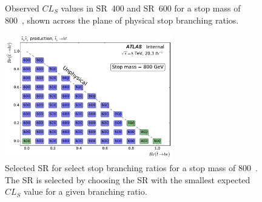 \begin{figure}[ht]
  \centering
  \caption{
    Observed $CL_S$ values in SR~400 and SR~600 for a stop mass of 800~\GeV,
    shown across the plane of physical stop branching ratios.
  }
\end{figure}

\begin{figure}[ht]
  \centering
  \includegraphics[width=0.65\textwidth]
    {figs/blstop/region_selection/region_choice_vs_br_m_800.pdf}
  \caption{
    Selected SR for select stop branching ratios for a stop mass of 800~\GeV.
    The SR is selected by choosing the SR with the smallest expected $CL_S$
    value for a given branching ratio.
  }
\end{figure}

